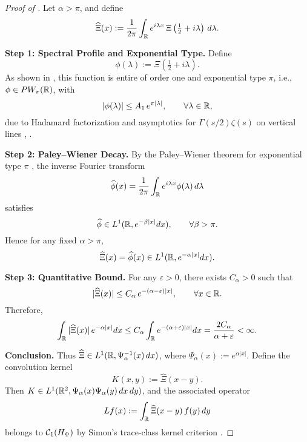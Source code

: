\begin{proof}[Proof of ]
Let \( \alpha > \pi \), and define
\[
\widehat{\Xi}(x) := \frac{1}{2\pi} \int_{\mathbb{R}} e^{i\lambda x} \, \Xi\left( \tfrac{1}{2} + i\lambda \right)\, d\lambda.
\]

\medskip
\noindent\textbf{Step 1: Spectral Profile and Exponential Type.}
Define
\[
\phi(\lambda) := \Xi\left( \tfrac{1}{2} + i\lambda \right).
\]
As shown in , this function is entire of order one and exponential type \( \pi \), i.e., \( \phi \in PW_\pi(\mathbb{R}) \), with
\[
|\phi(\lambda)| \le A_1\, e^{\pi |\lambda|}, \qquad \forall \lambda \in \mathbb{R},
\]
due to Hadamard factorization and asymptotics for \( \Gamma(s/2)\zeta(s) \) on vertical lines \cite[Ch.~3]{Levin1996EntireLectures}, \cite[Ch.~2]{Titchmarsh1986Zeta}.

\medskip
\noindent\textbf{Step 2: Paley--Wiener Decay.}
By the Paley--Wiener theorem for exponential type \( \pi \) \cite[Thm.~3.2.4]{Levin1996EntireLectures}, the inverse Fourier transform
\[
\widehat{\phi}(x) = \frac{1}{2\pi} \int_{\mathbb{R}} e^{i\lambda x} \phi(\lambda)\, d\lambda
\]
satisfies
\[
\widehat{\phi} \in L^1(\mathbb{R}, e^{-\beta |x|} dx), \qquad \forall \beta > \pi.
\]
Hence for any fixed \( \alpha > \pi \),
\[
\widehat{\Xi}(x) = \widehat{\phi}(x) \in L^1(\mathbb{R}, e^{-\alpha |x|} dx).
\]

\medskip
\noindent\textbf{Step 3: Quantitative Bound.}
For any \( \varepsilon > 0 \), there exists \( C_\alpha > 0 \) such that
\[
|\widehat{\Xi}(x)| \le C_\alpha\, e^{-(\alpha - \varepsilon)|x|}, \qquad \forall x \in \mathbb{R}.
\]
Therefore,
\[
\int_{\mathbb{R}} |\widehat{\Xi}(x)|\, e^{-\alpha |x|} dx
\le C_\alpha \int_{\mathbb{R}} e^{-(\alpha + \varepsilon)|x|} dx
= \frac{2 C_\alpha}{\alpha + \varepsilon} < \infty.
\]

\medskip
\noindent\textbf{Conclusion.}
Thus \( \widehat{\Xi} \in L^1(\mathbb{R}, \Psi_\alpha^{-1}(x)\, dx) \), where \( \Psi_\alpha(x) := e^{\alpha |x|} \). Define the convolution kernel
\[
K(x,y) := \widehat{\Xi}(x - y).
\]
Then \( K \in L^1(\mathbb{R}^2, \Psi_\alpha(x)\Psi_\alpha(y)\, dx\,dy) \), and the associated operator
\[
L f(x) := \int_{\mathbb{R}} \widehat{\Xi}(x - y)\, f(y)\, dy
\]
belongs to \( \mathcal{C}_1(H_{\Psi}) \) by Simon’s trace-class kernel criterion \cite[Thm.~4.2]{Simon2005TraceIdeals}.
\end{proof}
